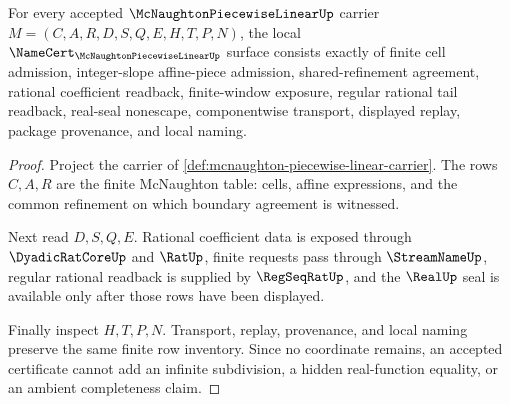 \begin{theorem}
\label{thm:mcnaughton-piecewise-linear-namecert-obligations}
For every accepted $\McNaughtonPiecewiseLinearUp$ carrier $M=(C,A,R,D,S,Q,E,H,T,P,N)$, the local $\NameCert_{\McNaughtonPiecewiseLinearUp}$ surface consists exactly of finite cell admission, integer-slope affine-piece admission, shared-refinement agreement, rational coefficient readback, finite-window exposure, regular rational tail readback, real-seal nonescape, componentwise transport, displayed replay, package provenance, and local naming.
\end{theorem}
\begin{proof}
Project the carrier of \autoref{def:mcnaughton-piecewise-linear-carrier}. The rows $C,A,R$ are the finite McNaughton table: cells, affine expressions, and the common refinement on which boundary agreement is witnessed.

Next read $D,S,Q,E$. Rational coefficient data is exposed through $\DyadicRatCoreUp$ and $\RatUp$, finite requests pass through $\StreamNameUp$, regular rational readback is supplied by $\RegSeqRatUp$, and the $\RealUp$ seal is available only after those rows have been displayed.

Finally inspect $H,T,P,N$. Transport, replay, provenance, and local naming preserve the same finite row inventory. Since no coordinate remains, an accepted certificate cannot add an infinite subdivision, a hidden real-function equality, or an ambient completeness claim.
\end{proof}

